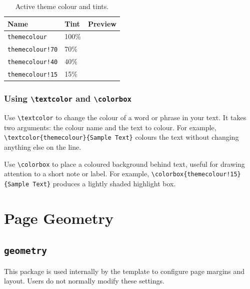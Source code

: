 \begin{table}[H]
	\centering
	\caption{Active theme colour and tints.}
	\label{tab:tints}
	\begin{tabular}{@{}lll@{}}
		\toprule
		Name & Tint & Preview \\
		\midrule
		\texttt{themecolour}     & 100\% & \textcolor{white}{\colorbox{themecolour}{\phantom{XXXXX}}} \\
		\texttt{themecolour!70}  & 70\%  & \textcolor{white}{\colorbox{themecolour!70}{\phantom{XXXXX}}} \\
		\texttt{themecolour!40}  & 40\%  & \colorbox{themecolour!40}{\phantom{XXXXX}} \\
		\texttt{themecolour!15}  & 15\%  & \colorbox{themecolour!15}{\phantom{XXXXX}} \\
		\bottomrule
	\end{tabular}
\end{table}

\subsubsection{Using \texttt{\textbackslash textcolor} and \texttt{\textbackslash colorbox}}
Use \texttt{\textbackslash textcolor} to change the colour of a word or phrase in your text. It takes two arguments: the colour name and the text to colour. For example, \textcolor{themecolour}{\texttt{\textbackslash textcolor\{themecolour\}\{Sample Text\}}} colours the text without changing anything else on the line.

Use \texttt{\textbackslash colorbox} to place a coloured background behind text, useful for drawing attention to a short note or label. For example, \colorbox{themecolour!15}{\texttt{\textbackslash colorbox\{themecolour!15\}\{Sample Text\}}} produces a lightly shaded highlight box.

\section{Page Geometry}

\subsection{\texttt{geometry}}
\noindent\colorbox{themecolour!15}{\parbox{\linewidth}{\small This package is used internally by the template to configure page margins and layout. Users do not normally modify these settings.}}\vspace{0.5\baselineskip}

